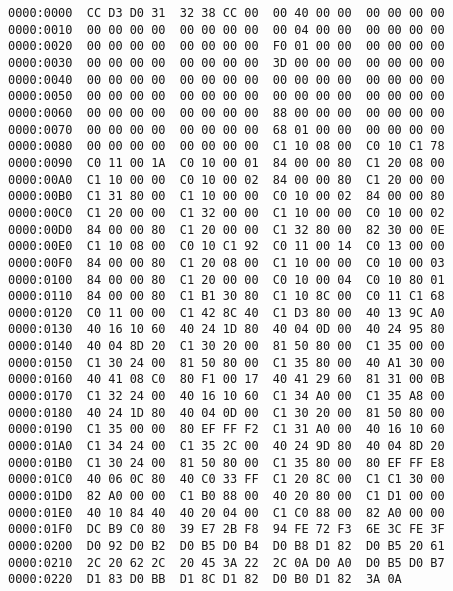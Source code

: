\documentclass[12pt,a4paper,oneside]{report}
\begin{document}
\begin{verbatim}
0000:0000  CC D3 D0 31  32 38 CC 00  00 40 00 00  00 00 00 00
0000:0010  00 00 00 00  00 00 00 00  00 04 00 00  00 00 00 00
0000:0020  00 00 00 00  00 00 00 00  F0 01 00 00  00 00 00 00
0000:0030  00 00 00 00  00 00 00 00  3D 00 00 00  00 00 00 00
0000:0040  00 00 00 00  00 00 00 00  00 00 00 00  00 00 00 00
0000:0050  00 00 00 00  00 00 00 00  00 00 00 00  00 00 00 00
0000:0060  00 00 00 00  00 00 00 00  88 00 00 00  00 00 00 00
0000:0070  00 00 00 00  00 00 00 00  68 01 00 00  00 00 00 00
0000:0080  00 00 00 00  00 00 00 00  C1 10 08 00  C0 10 C1 78
0000:0090  C0 11 00 1A  C0 10 00 01  84 00 00 80  C1 20 08 00
0000:00A0  C1 10 00 00  C0 10 00 02  84 00 00 80  C1 20 00 00
0000:00B0  C1 31 80 00  C1 10 00 00  C0 10 00 02  84 00 00 80
0000:00C0  C1 20 00 00  C1 32 00 00  C1 10 00 00  C0 10 00 02
0000:00D0  84 00 00 80  C1 20 00 00  C1 32 80 00  82 30 00 0E
0000:00E0  C1 10 08 00  C0 10 C1 92  C0 11 00 14  C0 13 00 00
0000:00F0  84 00 00 80  C1 20 08 00  C1 10 00 00  C0 10 00 03
0000:0100  84 00 00 80  C1 20 00 00  C0 10 00 04  C0 10 80 01
0000:0110  84 00 00 80  C1 B1 30 80  C1 10 8C 00  C0 11 C1 68
0000:0120  C0 11 00 00  C1 42 8C 40  C1 D3 80 00  40 13 9C A0
0000:0130  40 16 10 60  40 24 1D 80  40 04 0D 00  40 24 95 80
0000:0140  40 04 8D 20  C1 30 20 00  81 50 80 00  C1 35 00 00
0000:0150  C1 30 24 00  81 50 80 00  C1 35 80 00  40 A1 30 00
0000:0160  40 41 08 C0  80 F1 00 17  40 41 29 60  81 31 00 0B
0000:0170  C1 32 24 00  40 16 10 60  C1 34 A0 00  C1 35 A8 00
0000:0180  40 24 1D 80  40 04 0D 00  C1 30 20 00  81 50 80 00
0000:0190  C1 35 00 00  80 EF FF F2  C1 31 A0 00  40 16 10 60
0000:01A0  C1 34 24 00  C1 35 2C 00  40 24 9D 80  40 04 8D 20
0000:01B0  C1 30 24 00  81 50 80 00  C1 35 80 00  80 EF FF E8
0000:01C0  40 06 0C 80  40 C0 33 FF  C1 20 8C 00  C1 C1 30 00
0000:01D0  82 A0 00 00  C1 B0 88 00  40 20 80 00  C1 D1 00 00
0000:01E0  40 10 84 40  40 20 04 00  C1 C0 88 00  82 A0 00 00 
0000:01F0  DC B9 C0 80  39 E7 2B F8  94 FE 72 F3  6E 3C FE 3F
0000:0200  D0 92 D0 B2  D0 B5 D0 B4  D0 B8 D1 82  D0 B5 20 61
0000:0210  2C 20 62 2C  20 45 3A 22  2C 0A D0 A0  D0 B5 D0 B7
0000:0220  D1 83 D0 BB  D1 8C D1 82  D0 B0 D1 82  3A 0A
\end{verbatim}
\end{document}
